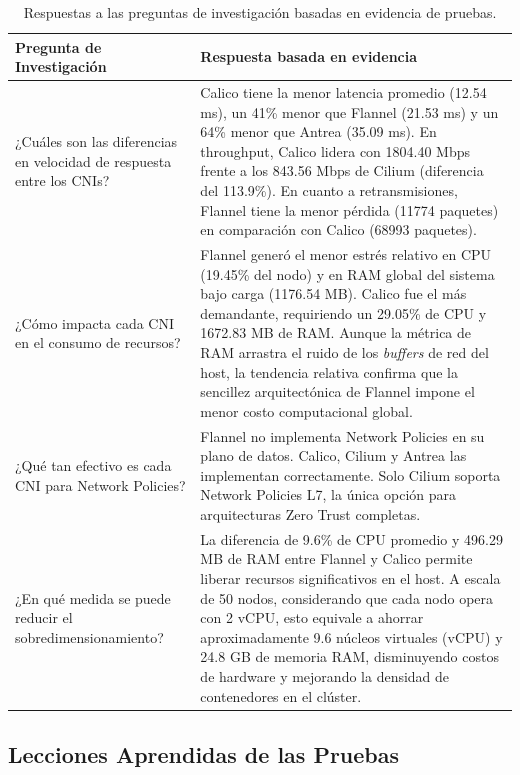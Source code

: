 \begin{table}[htbp]
\centering
\scriptsize
\caption{Respuestas a las preguntas de investigación basadas en evidencia de pruebas.}
\label{tab:respuestas-preguntas}
\begin{tabularx}{\textwidth}{|Y|Y|}
\hline
\textbf{Pregunta de Investigación} & \textbf{Respuesta basada en evidencia} \\
\hline
¿Cuáles son las diferencias en velocidad de respuesta entre los CNIs? & Calico tiene la menor latencia promedio (12.54 ms), un 41\% menor que Flannel (21.53 ms) y un 64\% menor que Antrea (35.09 ms). En throughput, Calico lidera con 1804.40 Mbps frente a los 843.56 Mbps de Cilium (diferencia del 113.9\%). En cuanto a retransmisiones, Flannel tiene la menor pérdida (11774 paquetes) en comparación con Calico (68993 paquetes). \\
\hline
¿Cómo impacta cada CNI en el consumo de recursos? & Flannel generó el menor estrés relativo en CPU (19.45\% del nodo) y en RAM global del sistema bajo carga (1176.54 MB). Calico fue el más demandante, requiriendo un 29.05\% de CPU y 1672.83 MB de RAM. Aunque la métrica de RAM arrastra el ruido de los \emph{buffers} de red del host, la tendencia relativa confirma que la sencillez arquitectónica de Flannel impone el menor costo computacional global. \\
\hline
¿Qué tan efectivo es cada CNI para Network Policies? & Flannel no implementa Network Policies en su plano de datos. Calico, Cilium y Antrea las implementan correctamente. Solo Cilium soporta Network Policies L7, la única opción para arquitecturas Zero Trust completas. \\
\hline
¿En qué medida se puede reducir el sobredimensionamiento? & La diferencia de 9.6\% de CPU promedio y 496.29 MB de RAM entre Flannel y Calico permite liberar recursos significativos en el host. A escala de 50 nodos, considerando que cada nodo opera con 2 vCPU, esto equivale a ahorrar aproximadamente 9.6 núcleos virtuales (vCPU) y 24.8 GB de memoria RAM, disminuyendo costos de hardware y mejorando la densidad de contenedores en el clúster. \\
\hline
\end{tabularx}
\end{table}

\subsection{Lecciones Aprendidas de las Pruebas}

